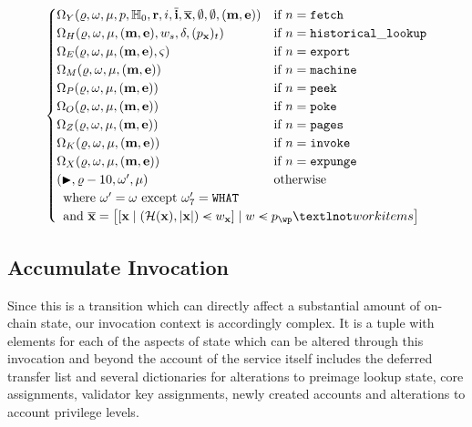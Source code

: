 \begin{align}
\begin{cases}
      \Omega_Y(\gascounter, \registers, \memory, p, \H_0, \mathbf{r}, i, \overline{\mathbf{i}}, \overline{\mathbf{x}}, \none, \none, (\mathbf{m}, \mathbf{e})) &\when n = \mathtt{fetch}\\
      \Omega_H(\gascounter, \registers, \memory, (\mathbf{m}, \mathbf{e}), w_s, \delta, (p_\mathbf{x})_t) &\when n = \mathtt{historical\_lookup}\\
      \Omega_E(\gascounter, \registers, \memory, (\mathbf{m}, \mathbf{e}), \segoff) &\when n = \mathtt{export}\\
      \Omega_M(\gascounter, \registers, \memory, (\mathbf{m}, \mathbf{e})) &\when n = \mathtt{machine}\\
      \Omega_P(\gascounter, \registers, \memory, (\mathbf{m}, \mathbf{e})) &\when n = \mathtt{peek}\\
      \Omega_O(\gascounter, \registers, \memory, (\mathbf{m}, \mathbf{e})) &\when n = \mathtt{poke}\\
      \Omega_Z(\gascounter, \registers, \memory, (\mathbf{m}, \mathbf{e})) &\when n = \mathtt{pages}\\
      \Omega_K(\gascounter, \registers, \memory, (\mathbf{m}, \mathbf{e})) &\when n = \mathtt{invoke}\\
      \Omega_X(\gascounter, \registers, \memory, (\mathbf{m}, \mathbf{e})) &\when n = \mathtt{expunge}\\
      (\continue, \gascounter - 10, \registers', \memory) &\otherwise\\
      \multicolumn{2}{l}{\where \registers' = \registers \exc \registers'_7 = \mathtt{WHAT}} \\
      \multicolumn{2}{l}{\also \overline{\mathbf{x}} = \sq{\sq{\mathbf{x} \mid (\hash(\mathbf{x}), |\mathbf{x}|) \orderedin w_\mathbf{x}} \mid w \orderedin p_\wp¬workitems}}
    \end{cases}
\end{align}

\subsection{Accumulate Invocation}\label{sec:accumulateinvocation}

Since this is a transition which can directly affect a substantial amount of on-chain state, our invocation context is accordingly complex. It is a tuple with elements for each of the aspects of state which can be altered through this invocation and beyond the account of the service itself includes the deferred transfer list and several dictionaries for alterations to preimage lookup state, core assignments, validator key assignments, newly created accounts and alterations to account privilege levels.

